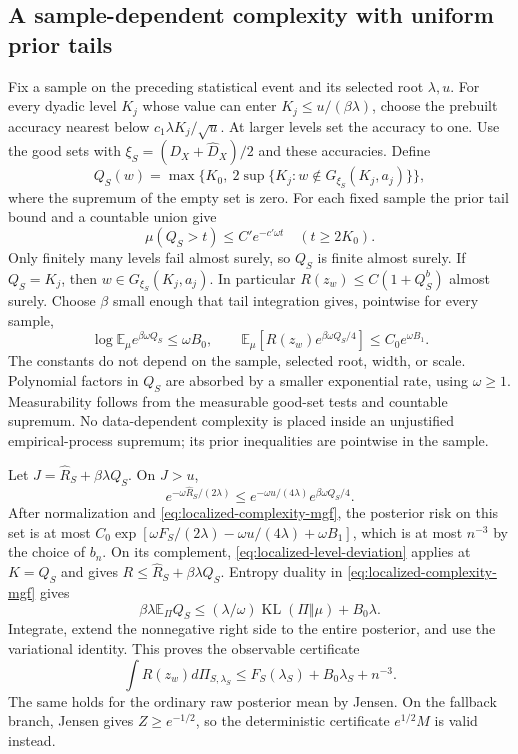 \subsection{A sample-dependent complexity with uniform prior tails}
Fix a sample on the preceding statistical event and its selected root
$\lambda,u$. For every dyadic level $K_j$ whose value can enter
$K_j\le u/(\beta\lambda)$, choose the prebuilt accuracy nearest below
$c_1\lambda K_j/\sqrt u$. At larger levels set the accuracy to one.
Use the good sets with $\xi_S=(D_X+\widehat D_X)/2$ and these accuracies.
Define
\[
 Q_S(w)=\max\{K_0,\ 2\sup\{K_j:w\notin G_{\xi_S}(K_j,a_j)\}\},
\]
where the supremum of the empty set is zero. For each fixed sample the
prior tail bound and a countable union give
\[
 \mu(Q_S>t)\le C'e^{-c'\omega t}\quad(t\ge2K_0).
\]
Only finitely many levels fail almost surely, so $Q_S$ is finite
almost surely. If $Q_S=K_j$, then $w\in G_{\xi_S}(K_j,a_j)$.
In particular $R(z_w)\le C(1+Q_S^b)$ almost surely.
Choose $\beta$ small enough that tail integration gives, pointwise
for every sample,
\begin{equation}
 \log\mathbb E_\mu e^{\beta\omega Q_S}\le\omega B_0,
 \qquad
 \mathbb E_\mu[R(z_w)e^{\beta\omega Q_S/4}]
       \le C_0e^{\omega B_1}.
 \label{eq:localized-complexity-mgf}
\end{equation}
The constants do not depend on the sample, selected root, width, or
scale. Polynomial factors in $Q_S$ are absorbed by a smaller
exponential rate, using $\omega\ge1$.
Measurability follows from the measurable good-set tests and countable
supremum. No data-dependent complexity is placed inside an
unjustified empirical-process supremum; its prior inequalities are
pointwise in the sample.

Let $J=\widehat R_S+\beta\lambda Q_S$. On $J>u$,
\[
 e^{-\omega\widehat R_S/(2\lambda)}
 \le e^{-\omega u/(4\lambda)}e^{\beta\omega Q_S/4}.
\]
After normalization and \eqref{eq:localized-complexity-mgf}, the
posterior risk on this set is at most
$C_0\exp[\omega F_S/(2\lambda)-\omega u/(4\lambda)+\omega B_1]$,
which is at most $n^{-3}$ by the choice of $b_n$.
On its complement, \eqref{eq:localized-level-deviation} applies at
$K=Q_S$ and gives $R\le\widehat R_S+\beta\lambda Q_S$.
Entropy duality in \eqref{eq:localized-complexity-mgf} gives
\[
 \beta\lambda\mathbb E_\Pi Q_S
 \le(\lambda/\omega)\operatorname{KL}(\Pi\Vert\mu)+B_0\lambda.
\]
Integrate, extend the nonnegative right side to the entire posterior,
and use the variational identity. This proves the observable certificate
\begin{equation}
 \int R(z_w)d\Pi_{S,\lambda_S}
 \le F_S(\lambda_S)+B_0\lambda_S+n^{-3}.
 \label{eq:localized-certificate}
\end{equation}
The same holds for the ordinary raw posterior mean by Jensen. On the
fallback branch, Jensen gives $Z\ge e^{-1/2}$, so the deterministic
certificate $e^{1/2}M$ is valid instead.

